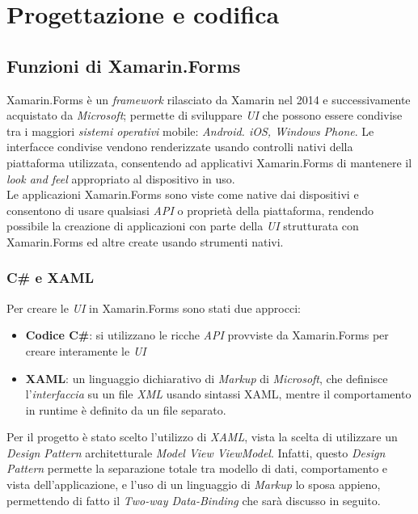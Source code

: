 \newpage
\chapter{Progettazione e codifica}
\label{cap:progettazione-codifica}
\section{Funzioni di Xamarin.Forms}
Xamarin.Forms è un \textit{framework} rilasciato da Xamarin nel 2014 e successivamente acquistato da \textit{Microsoft}; permette di sviluppare \textit{UI} che possono essere condivise tra i maggiori \textit{sistemi operativi} mobile: \textit{Android. iOS, Windows Phone}. Le interfacce condivise vendono renderizzate usando controlli nativi della piattaforma utilizzata, consentendo ad applicativi Xamarin.Forms di mantenere il \textit{look and feel} appropriato al dispositivo in uso. \\
Le applicazioni Xamarin.Forms sono viste come native dai dispositivi e consentono di usare qualsiasi \textit{API} o proprietà della piattaforma, rendendo possibile la creazione di applicazioni con parte della \textit{UI} strutturata con Xamarin.Forms ed altre create usando strumenti nativi.
\subsection{C\# e XAML}
Per creare le \textit{UI} in Xamarin.Forms sono stati due approcci:
\begin{itemize}
	\item \textbf{Codice C\#}: si utilizzano le ricche \textit{API} provviste da Xamarin.Forms per creare interamente le \textit{UI}
	\item \textbf{XAML}: un linguaggio dichiarativo di \textit{Markup} di \textit{Microsoft}, che definisce l'\textit{interfaccia} su un file \textit{XML} usando sintassi XAML, mentre il comportamento in runtime è definito da un file separato.
\end{itemize}
Per il progetto è stato scelto l'utilizzo di \textit{XAML}, vista la scelta di utilizzare un \textit{Design Pattern} architetturale \textit{Model View ViewModel}. Infatti, questo \textit{Design Pattern} permette la separazione totale tra modello di dati, comportamento e vista dell'applicazione, e l'uso di un linguaggio di \textit{Markup} lo sposa appieno, permettendo di fatto il \textit{Two-way Data-Binding} che sarà discusso in seguito.
